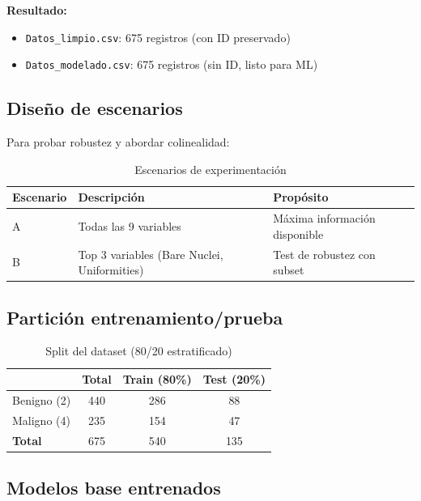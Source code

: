 \documentclass[11pt,a4paper]{article}
\begin{document}
\textbf{Resultado:}
\begin{itemize}[leftmargin=1.4cm]
\item \texttt{Datos\_limpio.csv}: 675 registros (con ID preservado)
\item \texttt{Datos\_modelado.csv}: 675 registros (sin ID, listo para ML)
\end{itemize}

\subsection{Diseño de escenarios}

Para probar robustez y abordar colinealidad:

\begin{table}[H]
\centering
\caption{Escenarios de experimentación}
\small
\renewcommand{\arraystretch}{1.2}
\begin{tabular}{lp{5cm}l}
\toprule
\textbf{Escenario} & \textbf{Descripción} & \textbf{Propósito} \\
\midrule
\rowcolor{bestrow}
A & Todas las 9 variables & Máxima información disponible \\
B & Top 3 variables (Bare Nuclei, Uniformities) & Test de robustez con subset \\
\bottomrule
\end{tabular}
\normalsize
\end{table}

\subsection{Partición entrenamiento/prueba}

\begin{table}[H]
\centering
\caption{Split del dataset (80/20 estratificado)}
\small
\renewcommand{\arraystretch}{1.15}
\begin{tabular}{lccc}
\toprule
& \textbf{Total} & \textbf{Train (80\%)} & \textbf{Test (20\%)} \\
\midrule
Benigno (2) & 440 & 286 & 88 \\
Maligno (4) & 235 & 154 & 47 \\
\midrule
\textbf{Total} & 675 & 540 & 135 \\
\bottomrule
\end{tabular}
\normalsize
\end{table}

\subsection{Modelos base entrenados}
\end{document}
